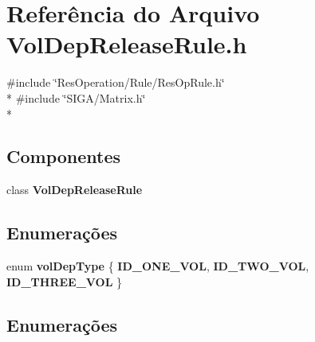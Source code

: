 \section{Referência do Arquivo Vol\+Dep\+Release\+Rule.\+h}
\label{_rule_2_vol_dep_release_2_vol_dep_release_rule_8h}
{\ttfamily \#include \char`\"{}Res\+Operation/\+Rule/\+Res\+Op\+Rule.\+h\char`\"{}}\\*
{\ttfamily \#include \char`\"{}S\+I\+G\+A/\+Matrix.\+h\char`\"{}}\\*
\subsection*{Componentes}
\begin{DoxyCompactItemize}
\item 
class {\bf Vol\+Dep\+Release\+Rule}
\end{DoxyCompactItemize}
\subsection*{Enumerações}
\begin{DoxyCompactItemize}
\item 
enum {\bf vol\+Dep\+Type} \{ {\bf I\+D\+\_\+\+O\+N\+E\+\_\+\+V\+OL}, 
{\bf I\+D\+\_\+\+T\+W\+O\+\_\+\+V\+OL}, 
{\bf I\+D\+\_\+\+T\+H\+R\+E\+E\+\_\+\+V\+OL}
 \}
\end{DoxyCompactItemize}


\subsection{Enumerações}
